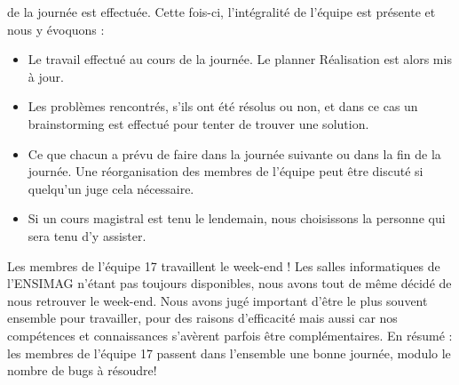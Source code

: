 \documentclass{article}
\begin{document}
de la journée est effectuée. Cette fois-ci, l'intégralité de l'équipe est présente et nous y évoquons :
\begin{itemize}
\item Le travail effectué au cours de la journée. Le planner Réalisation est alors mis à jour.
\item Les problèmes rencontrés, s'ils ont été résolus ou non, et dans ce cas un brainstorming est effectué pour tenter de trouver une solution.
\item Ce que chacun a prévu de faire dans la journée suivante ou dans la fin de la journée. Une réorganisation des membres de l'équipe peut être discuté si
quelqu'un juge cela nécessaire.
\item Si un cours magistral est tenu le lendemain, nous choisissons la personne qui sera tenu d'y assister.
\end{itemize}
Les membres de l'équipe 17 travaillent le week-end ! Les salles informatiques de l'ENSIMAG n'étant pas toujours disponibles,
nous avons tout de même décidé de nous retrouver le week-end. Nous avons jugé important d'être le plus souvent ensemble pour travailler,
pour des raisons d'efficacité mais aussi car nos compétences et connaissances s'avèrent parfois être complémentaires. \newline
En résumé : les membres de l'équipe 17 passent dans l'ensemble une bonne journée, modulo le nombre de bugs à résoudre!
\end{document}
